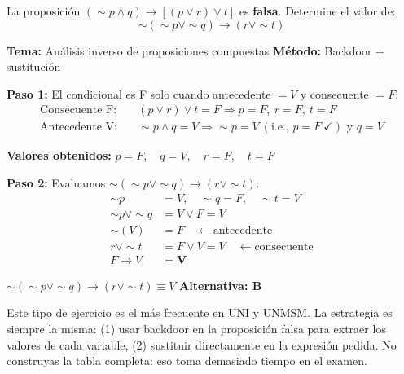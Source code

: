 \begin{tcolorbox}[
  enhanced, breakable,
  colback=GrisClaro, colframe=AzulPizarra,
  fonttitle=\bfseries\sffamily,
  title={Ejercicio 11 — Análisis avanzado: proposición condicional falsa (UNI/UNMSM)},
  arc=3pt, boxrule=0.8pt
]

\begin{problema}
La proposición $(\sim p \wedge q) \rightarrow [(p \vee r) \vee t]$ es \textbf{falsa}. Determine el valor de:
\[
  \sim(\sim p \vee \sim q) \rightarrow (r \vee \sim t)
\]
\end{problema}

\smallskip
\noindent
\textbf{\sffamily\color{AzulMedio}Tema:} Análisis inverso de proposiciones compuestas \hfill
\textbf{\sffamily\color{AzulMedio}Método:} Backdoor + sustitución

\medskip
\noindent\textbf{Paso 1:} El condicional es F solo cuando antecedente $= V$ y consecuente $= F$:
\begin{align*}
  \text{Consecuente F:} &\quad (p \vee r) \vee t = F \Rightarrow p = F,\ r = F,\ t = F \\
  \text{Antecedente V:} &\quad \sim p \wedge q = V \Rightarrow \sim p = V\ (\text{i.e., } p=F\ \checkmark) \text{ y } q = V
\end{align*}

\noindent\textbf{Valores obtenidos:} $p = F,\quad q = V,\quad r = F,\quad t = F$

\medskip
\noindent\textbf{Paso 2:} Evaluamos $\sim(\sim p \vee \sim q) \rightarrow (r \vee \sim t)$:
\begin{align*}
  \sim p &= V,\quad \sim q = F,\quad \sim t = V \\
  \sim p \vee \sim q &= V \vee F = V \\
  \sim(V) &= F \quad \leftarrow \text{antecedente} \\
  r \vee \sim t &= F \vee V = V \quad \leftarrow \text{consecuente} \\
  F \rightarrow V &= \mathbf{V}
\end{align*}

\begin{tcolorbox}[colback=AzulClaro!60, colframe=AzulPizarra, arc=2pt, boxrule=0.8pt, left=8pt, right=8pt]
\centering
$\displaystyle \boxed{\sim(\sim p \vee \sim q) \rightarrow (r \vee \sim t) \equiv V}$ \quad \textbf{Alternativa: B}
\end{tcolorbox}

\begin{cajatip}
Este tipo de ejercicio es el más frecuente en UNI y UNMSM. La estrategia es siempre la misma: (1) usar backdoor en la proposición falsa para extraer los valores de cada variable, (2) sustituir directamente en la expresión pedida. No construyas la tabla completa: eso toma demasiado tiempo en el examen.
\end{cajatip}
\end{tcolorbox}

